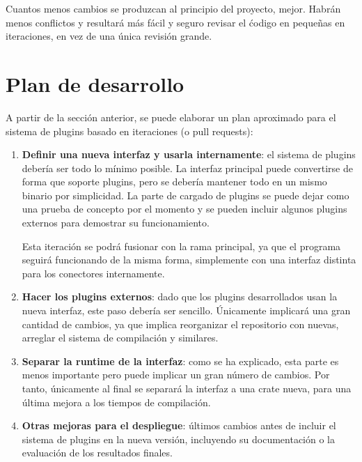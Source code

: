 Cuantos menos cambios se produzcan al principio del proyecto, mejor. Habrán
menos conflictos y resultará más fácil y seguro revisar el ćodigo en pequeñas en
iteraciones, en vez de una única revisión grande.

\section{Plan de desarrollo}

A partir de la sección anterior, se puede elaborar un plan aproximado para el
sistema de plugins basado en iteraciones (o pull requests):

\begin{enumerate}
    \item \textbf{Definir una nueva interfaz y usarla internamente}: el sistema
        de plugins debería ser todo lo mínimo posible. La interfaz principal
        puede convertirse de forma que soporte plugins, pero se debería mantener
        todo en un mismo binario por simplicidad. La parte de cargado de plugins
        se puede dejar como una prueba de concepto por el momento y se pueden
        incluir algunos plugins externos para demostrar su funcionamiento.

        Esta iteración se podrá fusionar con la rama principal, ya que el
        programa seguirá funcionando de la misma forma, simplemente con una
        interfaz distinta para los conectores internamente.

    \item \textbf{Hacer los plugins externos}: dado que los plugins
        desarrollados usan la nueva interfaz, este paso debería ser sencillo.
        Únicamente implicará una gran cantidad de cambios, ya que implica
        reorganizar el repositorio con \crates nuevas, arreglar el sistema de
        compilación y similares.

    \item \textbf{Separar la runtime de la interfaz}: como se ha explicado, esta
        parte es menos importante pero puede implicar un gran número de cambios.
        Por tanto, únicamente al final se separará la interfaz a una crate
         nueva, para una última mejora a los tiempos de
        compilación.

    \item \textbf{Otras mejoras para el despliegue}: últimos cambios antes de
        incluir el sistema de plugins en la nueva versión, incluyendo
        su documentación o la evaluación de los resultados finales.

\end{enumerate}

